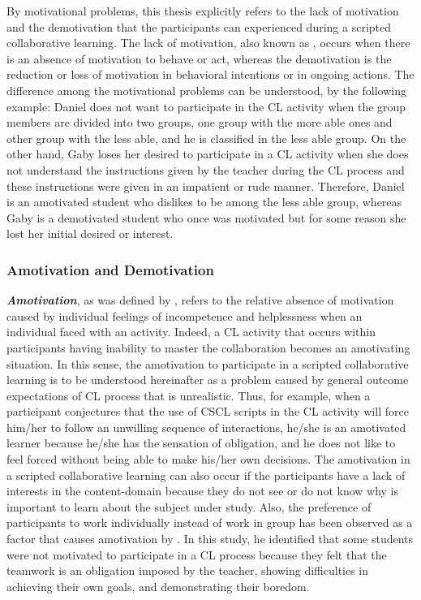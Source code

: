By motivational problems, this thesis explicitly refers to the lack of motivation and the demotivation that the participants can experienced during a scripted collaborative learning.
The lack of motivation, also known as  \cite{DeciRyan2010}, occurs when there is an absence of motivation to behave or act, whereas the demotivation is the reduction or loss of motivation in behavioral intentions or in ongoing actions.
The difference among the motivational problems can be understood, by the following example:
Daniel does not want to participate in the CL activity when the group members are divided into two groups, one group with the more able ones and other group with the less able, and he is classified in the less able group.
On the other hand, Gaby loses her desired to participate in a CL activity when she does not understand the instructions given by the teacher during the CL process and these instructions were given in an impatient or rude manner.
Therefore, Daniel is an amotivated student who dislikes to be among the less able group, whereas Gaby is a demotivated student who once was motivated but for some reason she lost her initial desired or interest.

\subsubsection{Amotivation and Demotivation}

\textbf{\emph{Amotivation}}, as was defined by , refers to the relative absence of motivation caused by individual feelings of incompetence and helplessness when an individual faced with an activity.
Indeed, a CL activity that occurs within participants having inability to master the collaboration becomes an amotivating situation.
In this sense, the amotivation to participate in a scripted collaborative learning is to be understood hereinafter as a problem caused by general outcome expectations of CL process that is unrealistic.
Thus, for example, when a participant conjectures that the use of CSCL scripts in the CL activity will force him/her to follow an unwilling sequence of interactions, he/she is an amotivated learner because he/she has the sensation of obligation, and he does not like to feel forced without being able to make his/her own decisions. 
The amotivation in a scripted collaborative learning can also occur if the participants have a lack of interests in the content-domain because they do not see or do not know why is important to learn about the subject under study.
Also, the preference of participants to work individually instead of work in group has been observed as a factor that causes amotivation by . In this study, he identified that some students were not motivated to participate in a CL process because they felt that the teamwork is an obligation imposed by the teacher, showing difficulties in achieving their own goals, and demonstrating their boredom.

